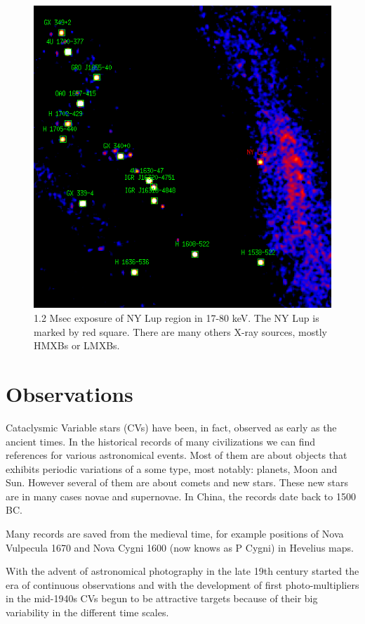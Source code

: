\documentclass[oneside,a4paper,11pt]{report}
\begin{document}
\begin{figure}[!hbt]
\centering
\includegraphics[totalheight=12cm]{plot/ds9_3}
\caption{1.2 Msec exposure of NY Lup region in 17-80 keV. The NY Lup is marked by red square. There are many others X-ray sources,
mostly HMXBs or LMXBs.}
\label{nylup1} 
\end{figure}



\section{Observations}
Cataclysmic Variable stars (CVs) have been, in fact, observed as early as the ancient times. In the historical 
records of  many civilizations we can find references for various astronomical events. Most of them are about objects
that exhibits periodic variations of a some type, most notably: planets, Moon and Sun. However several of them are about comets and new stars.  
These new stars are in many cases novae and supernovae. In China, the records date back to 1500 BC. 

Many records are saved from the medieval time, for example positions of Nova Vulpecula 1670 and 
Nova Cygni 1600 (now knows as P Cygni) in Hevelius maps. 

With the advent of astronomical photography in the late 19th century started the era of continuous observations
and with the development of first photo-multipliers in the mid-1940s CVs begun to be attractive 
targets because of their big variability in the different time scales. 
\end{document}
